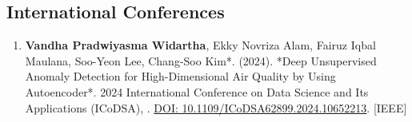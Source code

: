 \subsection{International Conferences}
\begin{enumerate}

  \item \textbf{Vandha Pradwiyasma Widartha}, Ekky Novriza Alam, Fairuz Iqbal Maulana, Soo-Yeon Lee, Chang-Soo Kim*. (2024). *Deep Unsupervised Anomaly Detection for High-Dimensional Air Quality by Using Autoencoder*. 2024 International Conference on Data Science and Its Applications (ICoDSA), . \url{DOI: 10.1109/ICoDSA62899.2024.10652213}. [IEEE]






\end{enumerate}
